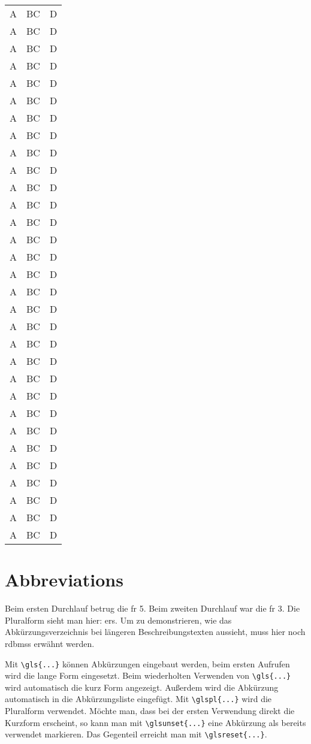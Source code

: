 \begin{longtable}{|l|l|l|}
A & BC & D \\
A & BC & D \\
A & BC & D \\
A & BC & D \\
A & BC & D \\
A & BC & D \\
A & BC & D \\
A & BC & D \\
A & BC & D \\
A & BC & D \\
A & BC & D \\
A & BC & D \\
A & BC & D \\
A & BC & D \\
A & BC & D \\
A & BC & D \\
A & BC & D \\
A & BC & D \\
A & BC & D \\
A & BC & D \\
A & BC & D \\
A & BC & D \\
A & BC & D \\
A & BC & D \\
A & BC & D \\
A & BC & D \\
A & BC & D \\
A & BC & D \\
A & BC & D \\
A & BC & D \\
A & BC & D \\
\end{longtable}


\section{Abbreviations}
Beim ersten Durchlauf betrug die \gls{fr} 5.
Beim zweiten Durchlauf war die \gls{fr} 3.
Die Pluralform sieht man hier: \glspl{er}.
Um zu demonstrieren, wie das Abkürzungsverzeichnis bei längeren Beschreibungstexten aussieht, muss hier noch \glspl{rdbms} erwähnt werden.

Mit \verb+\gls{...}+ können Abkürzungen eingebaut werden, beim ersten Aufrufen wird die lange Form eingesetzt.
Beim wiederholten Verwenden von \verb+\gls{...}+ wird automatisch die kurz Form angezeigt.
Außerdem wird die Abkürzung automatisch in die Abkürzungsliste eingefügt.
Mit \verb+\glspl{...}+ wird die Pluralform verwendet.
Möchte man, dass bei der ersten Verwendung direkt die Kurzform erscheint, so kann man mit \verb+\glsunset{...}+ eine Abkürzung als bereits verwendet markieren.
Das Gegenteil erreicht man mit \verb+\glsreset{...}+.

